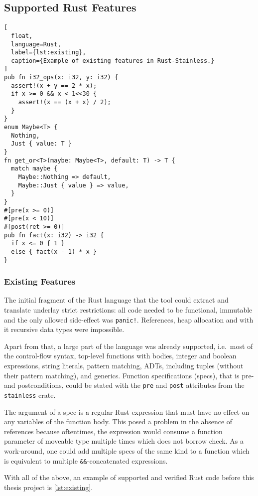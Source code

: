 \subsection{Supported Rust Features}
\label{sec:supported-features}

\begin{lstlisting}[
  float,
  language=Rust,
  label={lst:existing},
  caption={Example of existing features in Rust-Stainless.}
]
pub fn i32_ops(x: i32, y: i32) {
  assert!(x + y == 2 * x);
  if x >= 0 && x < 1<<30 {
    assert!(x == (x + x) / 2);
  }
}
enum Maybe<T> {
  Nothing,
  Just { value: T }
}
fn get_or<T>(maybe: Maybe<T>, default: T) -> T {
  match maybe {
    Maybe::Nothing => default,
    Maybe::Just { value } => value,
  }
}
#[pre(x >= 0)]
#[pre(x < 10)]
#[post(ret >= 0)]
pub fn fact(x: i32) -> i32 {
  if x <= 0 { 1 }
  else { fact(x - 1) * x }
}
\end{lstlisting}

\subsubsection{Existing Features}

The initial fragment of the Rust language that the tool could extract and
translate underlay strict restrictions: all code needed to be functional,
immutable and the only allowed side-effect was \lstinline"panic!". References,
heap allocation and with it recursive data types were impossible.

Apart from that, a large part of the language was already supported, i.e.~most
of the control-flow syntax, top-level functions with bodies, integer and boolean
expressions, string literals, pattern matching, ADTs, including tuples (without
their pattern matching), and generics. Function specifications (specs), that is
pre- and postconditions, could be stated with the \lstinline!pre! and
\lstinline!post! attributes from the \lstinline!stainless! crate.

The argument of a spec is a regular Rust expression that must have no effect on
any variables of the function body. This posed a problem in the absence of
references because oftentimes, the expression would consume a function parameter
of moveable type multiple times which does not borrow check. As a work-around,
one could add multiple specs of the same kind to a function which is equivalent
to multiple \lstinline!&&!-concatenated expressions.

With all of the above, an example of supported and verified Rust code before
this thesis project is \autoref{lst:existing}.

